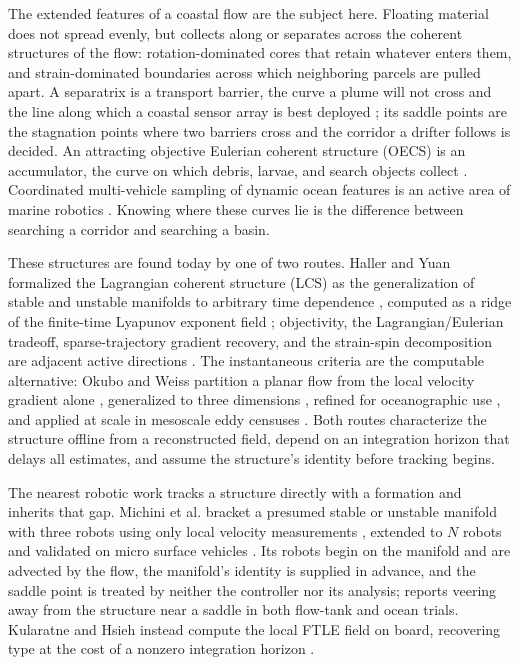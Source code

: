 \documentclass[lettersize,journal]{IEEEtran}
\begin{document}
The extended features of a coastal flow are the subject here. Floating
material does not spread evenly, but collects along or separates across
the coherent structures of the flow: rotation-dominated cores that
retain whatever enters them, and strain-dominated boundaries across
which neighboring parcels are pulled apart. A separatrix is a transport
barrier, the curve a plume will not cross and the line along which a
coastal sensor array is best deployed \cite{9,10,11}; its saddle
points are the stagnation points where two barriers cross and the
corridor a drifter follows is decided. An attracting objective Eulerian
coherent structure (OECS) is an accumulator, the curve on which debris,
larvae, and search objects collect \cite{12}. Coordinated
multi-vehicle sampling of dynamic ocean features is an active area of
marine robotics \cite{13,14,15}. Knowing where these curves lie is the
difference between searching a corridor and searching a basin.

These structures are found today by one of two routes. Haller and Yuan
formalized the Lagrangian coherent structure (LCS) as the
generalization of stable and unstable manifolds to arbitrary time
dependence \cite{9}, computed as a ridge of the finite-time Lyapunov
exponent field \cite{11}; objectivity, the Lagrangian/Eulerian
tradeoff, sparse-trajectory gradient recovery, and the strain-spin
decomposition are adjacent active directions \cite{16,17,18,19,20}. The
instantaneous criteria are the computable alternative: Okubo and Weiss
partition a planar flow from the local velocity gradient alone
\cite{21,22}, generalized to three dimensions \cite{23}, refined for
oceanographic use \cite{24}, and applied at scale in mesoscale eddy
censuses \cite{25}. Both routes characterize the structure offline from
a reconstructed field, depend on an integration horizon that delays
all estimates, and assume the structure's identity before tracking
begins.

The nearest robotic work tracks a structure directly with a formation
and inherits that gap. Michini et al. bracket a presumed stable or
unstable manifold with three robots using only local velocity
measurements \cite{26}, extended to $N$ robots \cite{27} and validated
on micro surface vehicles \cite{28,29}. Its robots begin on the
manifold and are advected by the flow, the manifold's identity is
supplied in advance, and the saddle point is treated by neither the
controller nor its analysis; \cite{26} reports veering away from the
structure near a saddle in both flow-tank and ocean trials. Kularatne
and Hsieh instead compute the local FTLE field on board, recovering
type at the cost of a nonzero integration horizon \cite{30}.
\end{document}
